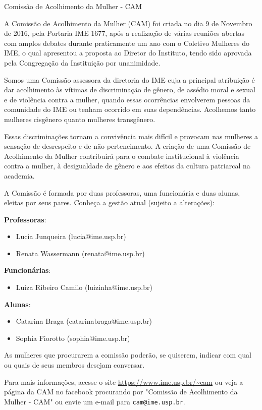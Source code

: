 \begin{subsecao}{Comissão de Acolhimento da Mulher - CAM}

A Comissão de Acolhimento da Mulher (CAM) foi criada no dia 9 de Novembro de 2016,
pela Portaria IME 1677, após a realização de várias reuniões abertas com amplos
debates durante praticamente um ano com o Coletivo Mulheres do IME, o qual 
apresentou a proposta ao Diretor do Instituto, tendo sido aprovada pela Congregação
da Instituição por unanimidade.

Somos uma Comissão assessora da diretoria do IME cuja a principal atribuição 
é dar acolhimento às vítimas de discriminação de gênero, de assédio moral e 
sexual e de violência contra a mulher, quando essas ocorrências envolverem 
pessoas da comunidade do IME ou tenham ocorrido em suas dependências. Acolhemos
tanto mulheres cisgênero quanto mulheres transgênero.

Essas discriminações tornam a convivência mais difícil e provocam nas mulheres
a sensação de desrespeito e de não pertencimento. A criação de uma Comissão de 
Acolhimento da Mulher contribuirá para o combate institucional à violência contra
a mulher, à desigualdade de gênero e aos efeitos da cultura patriarcal na academia.

A Comissão é formada por duas professoras, uma funcionária e duas alunas, 
eleitas por seus pares. Conheça a gestão atual (sujeito a alterações): 

\textbf{Professoras}: 
\begin{itemize}
  \item Lucia Junqueira (lucia@ime.usp.br)
  \item Renata Wassermann (renata@ime.usp.br)
\end{itemize}

\textbf{Funcionárias}: 
\begin{itemize}
  \item Luiza Ribeiro Camilo (luizinha@ime.usp.br)
\end{itemize}

\textbf{Alunas}: 
\begin{itemize}
  \item Catarina Braga (catarinabraga@ime.usp.br)
  \item Sophia Fiorotto (sophia@ime.usp.br)
\end{itemize}

As mulheres que procurarem a comissão poderão, se quiserem, indicar com qual ou 
quais de seus membros desejam conversar.

Para mais informações, acesse o site \url{https://www.ime.usp.br/~cam} ou veja
a página da CAM no facebook procurando por "Comissão de Acolhimento da Mulher - CAM" 
 ou envie um e-mail para {\tt cam@ime.usp.br}. 


\end{subsecao}
